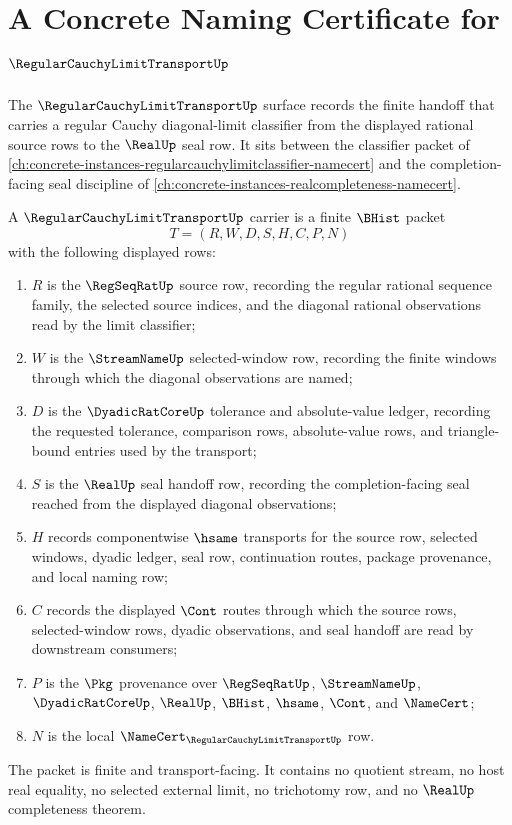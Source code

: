 \chapter{A Concrete Naming Certificate for $\RegularCauchyLimitTransportUp$}
\label{ch:concrete-instances-regularcauchylimittransport-namecert}

The $\RegularCauchyLimitTransportUp$ surface records the finite handoff that carries a regular Cauchy diagonal-limit classifier from the displayed rational source rows to the $\RealUp$ seal row. It sits between the classifier packet of \autoref{ch:concrete-instances-regularcauchylimitclassifier-namecert} and the completion-facing seal discipline of \autoref{ch:concrete-instances-realcompleteness-namecert}.

\begin{definition}
\label{def:regular-cauchy-limit-transport-carrier}
A $\RegularCauchyLimitTransportUp$ carrier is a finite $\BHist$ packet
$$
T=(R,W,D,S,H,C,P,N)
$$
with the following displayed rows:
\begin{enumerate}
\item $R$ is the $\RegSeqRatUp$ source row, recording the regular rational sequence family, the selected source indices, and the diagonal rational observations read by the limit classifier;
\item $W$ is the $\StreamNameUp$ selected-window row, recording the finite windows through which the diagonal observations are named;
\item $D$ is the $\DyadicRatCoreUp$ tolerance and absolute-value ledger, recording the requested tolerance, comparison rows, absolute-value rows, and triangle-bound entries used by the transport;
\item $S$ is the $\RealUp$ seal handoff row, recording the completion-facing seal reached from the displayed diagonal observations;
\item $H$ records componentwise $\hsame$ transports for the source row, selected windows, dyadic ledger, seal row, continuation routes, package provenance, and local naming row;
\item $C$ records the displayed $\Cont$ routes through which the source rows, selected-window rows, dyadic observations, and seal handoff are read by downstream consumers;
\item $P$ is the $\Pkg$ provenance over $\RegSeqRatUp$, $\StreamNameUp$, $\DyadicRatCoreUp$, $\RealUp$, $\BHist$, $\hsame$, $\Cont$, and $\NameCert$;
\item $N$ is the local $\NameCert_{\RegularCauchyLimitTransportUp}$ row.
\end{enumerate}
The packet is finite and transport-facing. It contains no quotient stream, no host real equality, no selected external limit, no trichotomy row, and no $\RealUp$ completeness theorem.
\end{definition}

